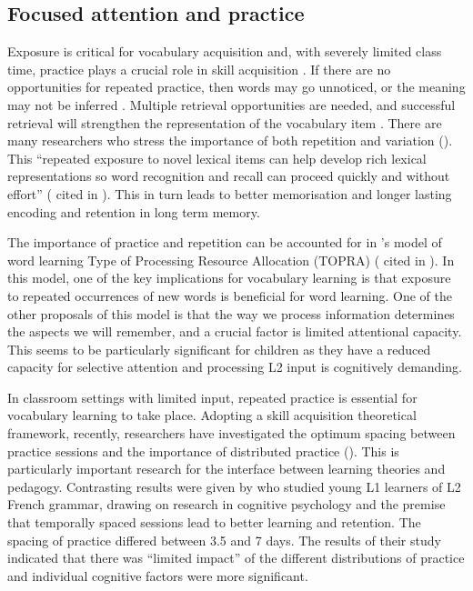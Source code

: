 \documentclass[output=paper]{langscibook}
\begin{document}
\subsection{Focused attention and practice}\largerpage

Exposure is critical for vocabulary acquisition and, with severely limited class time, practice plays a crucial role in skill acquisition \citep{DeKeyser2012}. If there are no opportunities for repeated practice, then words may go unnoticed, or the meaning may not be inferred \citep{Laufer2020}. Multiple retrieval opportunities are needed, and successful retrieval will strengthen the representation of the vocabulary item \citep{Nakata2020}. There are many researchers who stress the importance of both repetition and variation (\citealt{Lightbown2008,Kersten2011}). This ``repeated exposure to novel lexical items can help develop rich lexical representations so word recognition and recall can proceed quickly and without effort'' (\citealt{Perfetti2007} cited in \citealt[215]{Kormos2020}). This in turn leads to better memorisation and longer lasting encoding and retention in long term memory.

The importance of practice and repetition can be accounted for in \citeauthor{Barcroft2002}’s model of word learning Type of Processing Resource Allocation (TOPRA) (\citeyear{Barcroft2002, Barcroft2013} cited in \citealt[262]{Newton2020}). In this model, one of the key implications for vocabulary learning is that exposure to repeated occurrences of new words is beneficial for word learning. One of the other proposals of this model is that the way we process information determines the aspects we will remember, and a crucial factor is limited attentional capacity. This seems to be particularly significant for children as they have a reduced capacity for selective attention \citep{Fougnie2008} and processing L2 input is cognitively demanding.

In classroom settings with limited input, repeated practice is essential for vocabulary learning to take place. Adopting a skill acquisition theoretical framework, recently, researchers have investigated the optimum spacing between practice sessions and the importance of distributed practice (\citealt{LiDeKeyser2019,SuzukiEtAl2019,RogersCheung2020}). This is particularly important research for the interface between learning theories and pedagogy. Contrasting results were given by \citet{KasprowiczEtAl2019} who studied young L1 learners of L2 French grammar, drawing on research in cognitive psychology and the premise that temporally spaced sessions lead to better learning and retention. The spacing of practice differed between 3.5 and 7 days. The results of their study indicated that there was “limited impact” of the different distributions of practice and individual cognitive factors were more significant.
\end{document}
